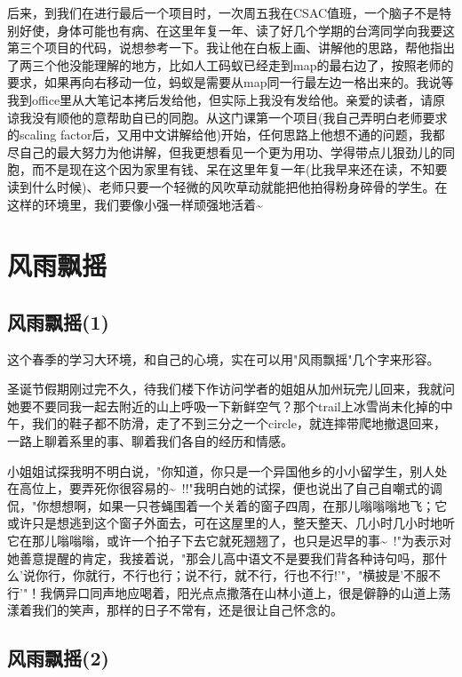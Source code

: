 \documentclass[12pt]{book}
\begin{document}
后来，到我们在进行最后一个项目时，一次周五我在CSAC值班，一个脑子不是特别好使，身体可能也有病、在这里年复一年、读了好几个学期的台湾同学向我要这第三个项目的代码，说想参考一下。我让他在白板上画、讲解他的思路，帮他指出了两三个他没能理解的地方，比如人工码蚁已经走到map的最右边了，按照老师的要求，如果再向右移动一位，蚂蚁是需要从map同一行最左边一格出来的。我说等我到office里从大笔记本拷后发给他，但实际上我没有发给他。亲爱的读者，请原谅我没有顺他的意帮助自已的同胞。从这门课第一个项目(我自己弄明白老师要求的scaling factor后，又用中文讲解给他)开始，任何思路上他想不通的问题，我都尽自己的最大努力为他讲解，但我更想看见一个更为用功、学得带点儿狠劲儿的同胞，而不是现在这个因为家里有钱、呆在这里年复一年(比我早来还在读，不知要读到什么时候)、老师只要一个轻微的风吹草动就能把他拍得粉身碎骨的学生。在这样的环境里，我们要像小强一样顽强地活着\textasciitilde{}~

\chapter{风雨飘摇}
\label{sec-33}
\section{风雨飘摇(1)}
\label{sec-33-1}

这个春季的学习大环境，和自己的心境，实在可以用"风雨飘摇"几个字来形容。

圣诞节假期刚过完不久，待我们楼下作访问学者的姐姐从加州玩完儿回来，我就问她要不要同我一起去附近的山上呼吸一下新鲜空气？那个trail上冰雪尚未化掉的中午，我们的鞋子都不防滑，走了不到三分之一个circle，就连摔带爬地撤退回来，一路上聊着系里的事、聊着我们各自的经历和情感。

小姐姐试探我明不明白说，"你知道，你只是一个异国他乡的小小留学生，别人处在高位上，要弄死你很容易的\textasciitilde{}~!!"我明白她的试探，便也说出了自己自嘲式的调侃，"你想想啊，如果一只苍蝇围着一个关着的窗子四周，在那儿嗡嗡嗡地飞；它或许只是想逃到这个窗子外面去，可在这屋里的人，整天整天、几小时几小时地听它在那儿嗡嗡嗡，或许一个拍子下去它就死翘翘了，也只是迟早的事\textasciitilde{}~!"为表示对她善意提醒的肯定，我接着说，"那会儿高中语文不是要我们背各种诗句吗，那什么'说你行，你就行，不行也行；说不行，就不行，行也不行!'"，"横披是'不服不行'"！我俩异口同声地应喝着，阳光点点撒落在山林小道上，很是僻静的山道上荡漾着我们的笑声，那样的日子不常有，还是很让自己怀念的。

\section{风雨飘摇(2)}
\label{sec-33-2}
\end{document}
